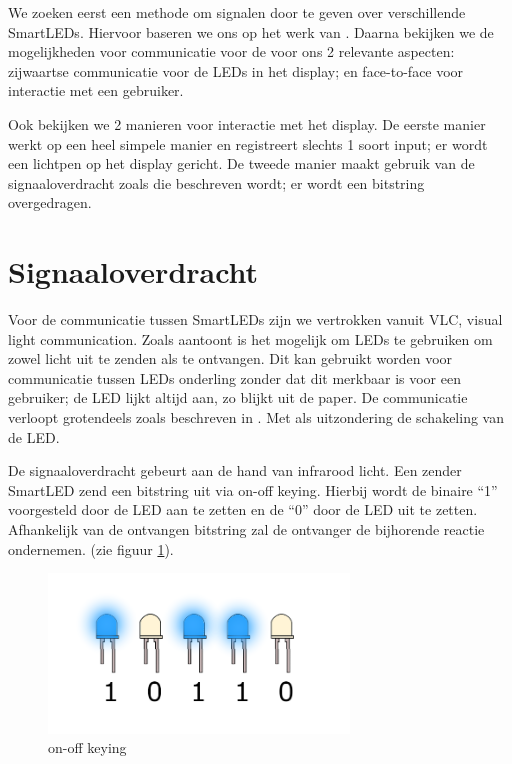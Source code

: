 \documentclass{article}
\begin{document}
We zoeken eerst een methode om signalen door te geven over verschillende SmartLEDs. Hiervoor baseren we ons op het werk van \cite{smartLED}. Daarna bekijken we de mogelijkheden voor communicatie voor de voor ons 2 relevante aspecten: zijwaartse communicatie voor de LEDs in het display; en face-to-face voor interactie met een gebruiker.
 
Ook bekijken we 2 manieren voor interactie met het display. De eerste manier werkt op een heel simpele manier en registreert slechts 1 soort input; er wordt een lichtpen op het display gericht. De tweede manier maakt gebruik van de signaaloverdracht zoals die beschreven wordt; er wordt een bitstring overgedragen. 

\section{Signaaloverdracht}\label{signaaloverdracht}

Voor de communicatie tussen SmartLEDs zijn we vertrokken vanuit VLC, visual light communication. Zoals \cite{VLCNetworks} aantoont is het mogelijk om LEDs te gebruiken om zowel licht uit te zenden als te ontvangen. Dit kan gebruikt worden voor communicatie tussen LEDs onderling zonder dat dit merkbaar is voor een gebruiker; de LED lijkt altijd aan, zo blijkt uit de paper. De communicatie verloopt grotendeels zoals beschreven in \cite{smartLED}. Met als uitzondering de schakeling van de LED. 

De signaaloverdracht gebeurt aan de hand van infrarood licht. Een zender SmartLED zend een bitstring uit via on-off keying. Hierbij wordt de binaire “1” voorgesteld door de LED aan te zetten en de “0” door de LED uit te zetten. Afhankelijk van de ontvangen bitstring zal de ontvanger de bijhorende reactie ondernemen. (zie figuur \ref{fig:onfoff}).

\begin{figure}[H]
\centering
\includegraphics[width=8cm]{OnOff.png}
\caption{on-off keying}
\label{fig:onfoff}
\end{figure}
\end{document}
